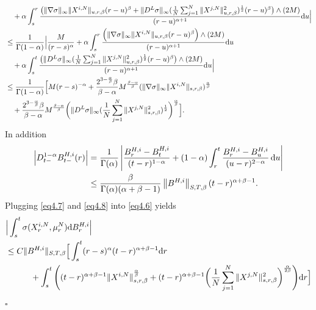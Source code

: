 \documentclass[12pt]{article}
\def\d{\text{\rm{d}}}
\newenvironment{proof}{{\noindent\it Proof.}\ }{\hfill $\square$\par}
\numberwithin{equation}{section}
\begin{document}
\begin{proof}
\begin{equation}
\begin{aligned}
				&\quad+\alpha\int_{s}^{r}
				\frac{\big(\|\nabla\sigma\|_{\infty}\|X^{i,N}\|_{u,r,\beta}(r-u)^{\beta}+\|D^L\sigma\|_{\infty}(\frac{1}{N}\sum_{j=1}^N\|X^{j,N}\|^2_{u,r,\beta})^{\frac{1}{2}}(r-u)^{\beta}\big)\wedge (2M)}{(r-u)^{\alpha+1}}\d u\Big|\\
				&\leq \frac{1}{\Gamma(1-\alpha)}\Big|\frac{M}{(r-s)^{\alpha}}+\alpha\int_{s}^{r}
				\frac{\Big(\|\nabla\sigma\|_{\infty}\|X^{i,N}\|_{u,r,\beta}(r-u)^{\beta}\Big)\wedge (2M)}{(r-u)^{\alpha+1}}\d u\\
				&\quad+\alpha\int_{s}^{t}\frac{\big(\|D^L\sigma\|_{\infty}(\frac{1}{N}\sum_{j=1}^N\|X^{j,N}\|^2_{u,r,\beta})^{\frac{1}{2}}(r-u)^{\beta}\big)\wedge (2M)}{(r-u)^{\alpha+1}}\d u\Big|\\
				&\leq \frac{1}{\Gamma(1-\alpha)}\Big[M(r-s)^{-\alpha}+\frac{2^{3-\frac{\alpha}{\beta}}\beta}{\beta-\alpha}M^{\frac{\beta-\alpha}{\beta}}(\|\nabla\sigma\|_{\infty}\|X^{i,N}\|_{s,r,\beta})^{\frac{\alpha}{\beta}}\\
				&\quad+\frac{2^{3-\frac{\alpha}{\beta}}\beta}{\beta-\alpha}M^{\frac{\beta-\alpha}{\beta}}\bigg( \|D^L\sigma\|_{\infty}(\frac{1}{N}\sum_{j=1}^N\|X^{j,N}\|^2_{s,r,\beta})^{\frac{1}{2}}\bigg)^{\frac{\alpha}{\beta}}
				\Big].
			\end{aligned}
		\end{equation}
		In addition
		\begin{equation}\label{eq4.8}
			\begin{aligned}
				\left|D_{t-}^{1-\alpha} B_{t-}^{H,i}(r)\right| & =\frac{1}{\Gamma(\alpha)}\left|\frac{B_{r}^{H,i}-B_{t}^{H,i}}{(t-r)^{1-\alpha}}+(1-\alpha) \int_{r}^{t} \frac{B_{r}^{H,i}-B_{u}^{H,i}}{(u-r)^{2-\alpha}} \, \d u\right| \\
				& \leq \frac{\beta}{\Gamma(\alpha)(\alpha+\beta-1)}\left\| B^{H,i}\right\| _{S, T, \beta}(t-r)^{\alpha+\beta-1} .
			\end{aligned}
		\end{equation}
		Plugging \eqref{eq4.7} and \eqref{eq4.8} into \eqref{eq4.6} yields
		\begin{align*}
			&\Big|\int_{s}^{t}\sigma(X_r^{i,N},\mu_r^N)\d B^{H,i}_r\Big|\\
			&\leq C\|B^{H,i}\|_{S,T,\beta}\Big[ \int_{s}^{t}(r-s)^{\alpha}(t-r)^{\alpha+\beta-1}\d r\\
			&\quad\quad\quad+\int_{s}^{t}\Bigg((t-r)^{\alpha+\beta-1}\|X^{i,N}\|_{s,r,\beta}^{\frac{\alpha}{\beta}}+(t-r)^{\alpha+\beta-1}\bigg(\frac{1}{N}\sum_{j=1}^N\|X^{j,N}\|^2_{s,r,\beta}\bigg)^{\frac{\alpha}{2\beta}}\Bigg)\d r\Big]\\

\end{align*}
\end{proof}
\end{document}
